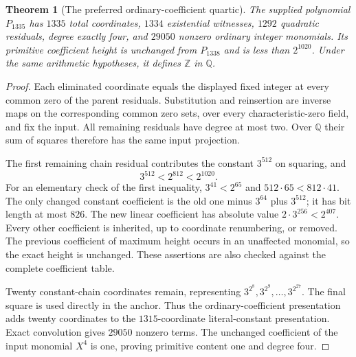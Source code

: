 \documentclass[11pt]{article}
\newtheorem{theorem}{Theorem}[section]
\theoremstyle{definition}
\begin{document}
\begin{theorem}[The preferred ordinary-coefficient quartic]
\label{thm:p3-small-coefficient-1335}
The supplied polynomial $P_{1335}$ has $1335$ total coordinates,
$1334$ existential witnesses, $1292$ quadratic residuals, degree
exactly four, and $29050$ nonzero ordinary integer monomials.
Its primitive coefficient height is unchanged from $P_{1338}$ and
is less than $2^{1020}$.  Under the same arithmetic hypotheses,
it defines $\mathbb Z$ in $\mathbb Q$.
\end{theorem}
\begin{proof}
Each eliminated coordinate equals the displayed fixed integer
at every common zero of the parent residuals.  Substitution and
reinsertion are inverse maps on the corresponding common zero
sets, over every characteristic-zero field, and fix the input.
All remaining residuals have degree at most two.  Over $\mathbb Q$
their sum of squares therefore has the same input projection.

The first remaining chain residual contributes the constant
$3^{512}$ on squaring, and
\[
                             3^{512}<2^{812}<2^{1020}.
\]
For an elementary check of the first inequality, $3^{41}<2^{65}$
and $512\cdot65<812\cdot41$.  The only changed constant
coefficient is the old one minus $3^{64}$ plus $3^{512}$; it
has bit length at most $826$.  The new linear coefficient has
absolute value $2\cdot3^{256}<2^{407}$.  Every other coefficient
is inherited, up to coordinate renumbering, or removed.  The
previous coefficient of maximum height occurs in an unaffected
monomial, so the exact height is unchanged.  These assertions
are also checked against the complete coefficient table.

Twenty constant-chain coordinates remain, representing
$3^{2^8},3^{2^9},\ldots,3^{2^{27}}$.  The final square is
used directly in the anchor.  Thus the ordinary-coefficient
presentation adds twenty coordinates to the $1315$-coordinate
literal-constant presentation.  Exact convolution gives $29050$
nonzero terms.  The unchanged coefficient of the input monomial
$X^4$ is one, proving primitive content one and degree four.
\end{proof}
\end{document}
